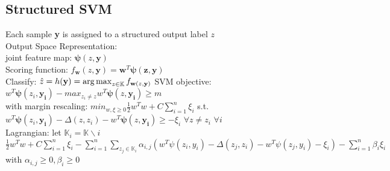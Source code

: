 \subsection*{Structured SVM}
Each sample \textbf{y} is assigned to a structured output label $z$\\
Output Space Representation:\\
joint feature map: $\mathbf{\psi}(z,\mathbf{y})$\\
Scoring function: $f_{\mathbf{w}}(z,\mathbf{y})=\mathbf{w}^T\mathbf{\psi(z, \mathbf{y})}$\\
Classify: $\hat{z}=h(\mathbf{y})=\operatorname*{arg\,max}_{z\in\mathbb{K}}f_{\mathbf{w}(z, \mathbf{y})}$
SVM objective: \\ $w^T\mathbf{\psi}(z_i,\mathbf{y_i})-max_{z_i \neq z}w^T\mathbf{\psi}(z,\mathbf{y_i}) \geq m$ \\
with margin rescaling: $min_{w, \xi \geq 0} \frac{1}{2}w^Tw + C \sum_{i=1}^n \xi_i$ s.t. $w^T\mathbf{\psi}(z_i,\mathbf{y_i})-\Delta(z,z_i)
-w^T\mathbf{\psi}(z,\mathbf{y_i}) \geq - \xi_i$ $\forall z \neq z_i$ $\forall i$ \\
Lagrangian: let $\mathbb{K}_i = \mathbb{K} \backslash i$ \\ $\frac{1}{2}w^Tw + C \sum_{i=1}^n \xi_i - \sum_{i=1}^n \sum_{z_j \in \mathbb{K}_i} \alpha_{i,j} (w^T \psi(z_i, y_i)- \Delta (z_j, z_i) - w^T \psi(z_j,y_i)- \xi_i) - \sum_{i=1}^n \beta_i \xi_i$ with $\alpha_{i,j} \geq 0, \beta_i \geq 0$ 
